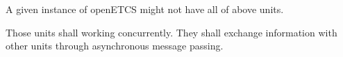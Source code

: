 A given instance of openETCS might not have all of above
units. 

Those units shall working concurrently. They shall exchange
information with other units through asynchronous message passing.

